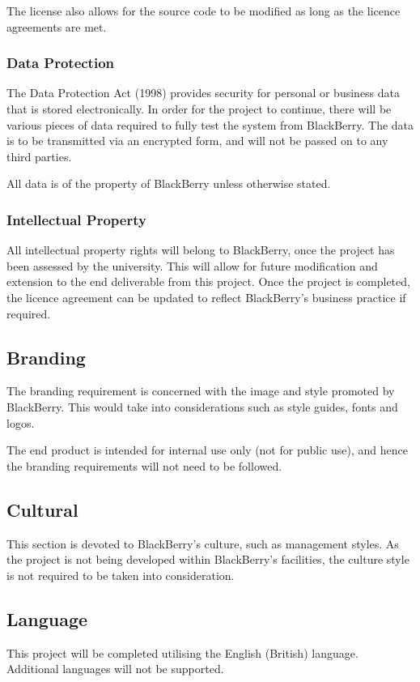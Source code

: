 The license also allows for the source code to be modified as long as the 
licence agreements are met.

\subsubsection*{Data Protection}
The Data Protection Act (1998) provides security for personal or business data 
that is stored electronically. In order for the project to continue, there will 
be various pieces of data required to fully test the system from BlackBerry. 
The data is to be transmitted via an encrypted form, and will not be passed on 
to any third parties. 

All data is of the property of BlackBerry unless otherwise stated.

\subsubsection*{Intellectual Property}
All intellectual property rights will belong to BlackBerry, once the project 
has been assessed by the university. This will allow for future modification 
and extension to the end deliverable from this project. Once the project is 
completed, the licence agreement can be updated to reflect BlackBerry’s 
business practice if required.

\subsection{Branding}
The branding requirement is concerned with the image and style promoted by 
BlackBerry. This would take into considerations such as style guides, fonts and 
logos. 

The end product is intended for internal use only (not for public use), and 
hence the branding requirements will not need to be followed.

\subsection{Cultural}
This section is devoted to BlackBerry's culture, such as management styles. As 
the project is not being developed within BlackBerry's facilities, the culture 
style is not required to be taken into consideration.

\subsection{Language}
This project will be completed utilising the English (British) language. 
Additional languages will not be supported.